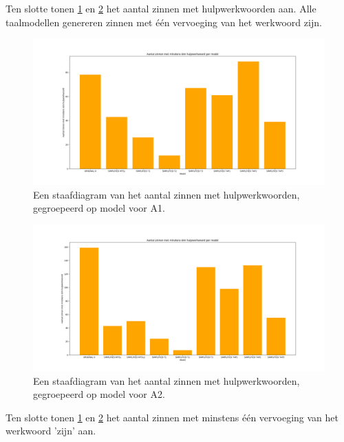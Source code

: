 Ten slotte tonen \ref{img:histplot-aux-a1} en \ref{img:histplot-aux-a2} het aantal zinnen met hulpwerkwoorden aan. Alle taalmodellen genereren zinnen met één vervoeging van het werkwoord zijn.

\begin{figure}[H]
	\includegraphics[width=\linewidth]{img/boxplot-aux-a1.png}
	\caption{Een staafdiagram van het aantal zinnen met hulpwerkwoorden, gegroepeerd op model voor A1.}
	\label{img:histplot-aux-a1}
\end{figure}

\begin{figure}[H]
	\includegraphics[width=\linewidth]{img/boxplot-aux-a2.png}
	\caption{Een staafdiagram van het aantal zinnen met hulpwerkwoorden, gegroepeerd op model voor A2.}
	\label{img:histplot-aux-a2}
\end{figure}

Ten slotte tonen \ref{img:histplot-aux-a1} en \ref{img:histplot-aux-a2} het aantal zinnen met minstens één vervoeging van het werkwoord 'zijn' aan. 


